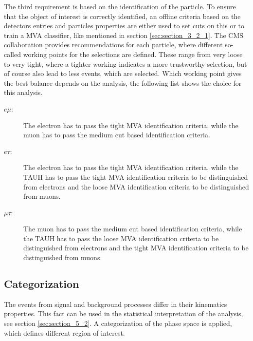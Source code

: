 The third requirement is based on the identification of the particle. To ensure that the object of interest is correctly identified, an offline criteria based on the detectors entries and particles properties are either used to set cuts on this or to train a \gls{MVA} classifier, like mentioned in section \ref{sec:section_3_2_1}. The \gls{CMS} collaboration provides recommendations for each particle, where different so-called working points for the selections are defined. These range from very loose to very tight, where a tighter working indicates a more trustworthy selection, but of course also lead to less events, which are selected. Which working point gives the best balance depends on the analysis, the following list shows the choice for this analysis. 

\begin{description}
	\item [$e\mu$:] The electron has to pass the tight \gls{MVA} identification criteria, while the muon has to pass the medium cut based identification criteria. 
	\item [$e\tau$:]  The electron has to pass the tight \gls{MVA} identification criteria, while the \gls{TAUH} has to pass the tight \gls{MVA} identification criteria to be distinguished from electrons and the loose \gls{MVA} identification criteria to be distinguished from muons.
	\item [$\mu\tau$:]  The muon has to pass the medium cut based identification criteria, while the \gls{TAUH} has to pass the loose \gls{MVA} identification criteria to be distinguished from electrons and the tight \gls{MVA} identification criteria to be distinguished from muons.
\end{description}


\subsection{Categorization}
\label{sec:section_3_2_3}

The events from signal and background processes differ in their kinematics properties. This fact can be used in the statistical interpretation of the analysis, see section \ref{sec:section_5_2}. A categorization of the phase space is applied, which defines different region of interest. \\

